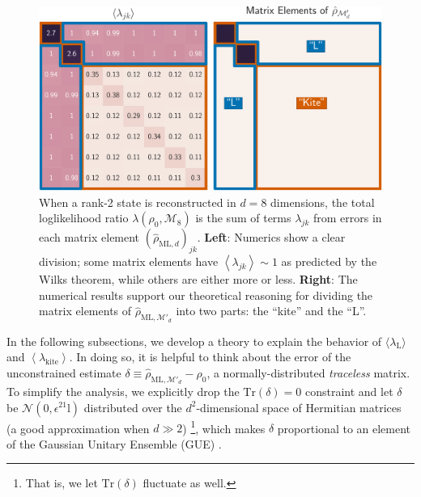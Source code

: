 \documentclass[aps,pra, twocolumn]{revtex4-1}
\newcommand{\M}{\mathcal{M}}
\newcommand{\Tr}{\mathrm{Tr}}
\newcommand{\Id}{\mathbb{I}}
\newcommand{\expect}[1]{\ensuremath{\left\langle#1\right\rangle}}
\def\Id{1\!\mathrm{l}}
\newcommand{\rhohat}{\hat{\rho}}
\newcommand{\rhoML}[1]{\rhohat_{\scriptscriptstyle{\mathrm{ML},#1}}}
\begin{document}
\begin{figure}[h]
\includegraphics[width=\columnwidth]{Images/Figure_3.pdf}
 \caption{When a rank-2 state is reconstructed in $d=8$ dimensions, the total loglikelihood ratio $\lambda(\rho_0,\mathcal{M}_8)$ is the sum of terms $\lambda_{jk}$ from errors in each matrix element $(\rhoML{d})_{jk}$.  \textbf{Left}:  Numerics show a clear division; some matrix elements have $\expect{\lambda_{jk}}\sim1$ as predicted by the Wilks theorem, while others are either more or less. \textbf{Right}:  The numerical results support our theoretical reasoning for dividing the matrix elements of $\rhoML{\M'_{d}}$ into two parts: the ``kite'' and the ``L''.}
\label{fig:L}
\end{figure}

In the following subsections, we develop a theory to explain the behavior of $\langle \lambda_{\mathrm{L}}\rangle$ and \expect{\lambda_{\mathrm{kite}}}.
In doing so, it is helpful to think about the error of the unconstrained estimate $\delta \equiv \rhoML{\M'_{d}}- \rho_{0}$, a normally-distributed \emph{traceless} matrix.  To simplify the analysis, we explicitly drop the $\Tr(\delta)=0$ constraint and let $\delta$ be $\mathcal{N}(0,\epsilon^2\Id)$ distributed over the $d^2$-dimensional space of Hermitian matrices (a good approximation when $d\gg2$) \footnote{That is, we let $\mathrm{Tr}(\delta)$ fluctuate as well.}, which makes $\delta$ proportional to an element of the Gaussian Unitary Ensemble (GUE) \cite{Fyodorov2005}.
\end{document}
